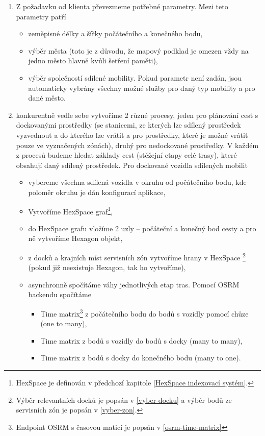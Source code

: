 \documentclass[thesis=M,czech]{FITthesis}[2019/12/23]
\theoremstyle{plain}
\theoremstyle{definition}
\begin{document}
\begin{enumerate}
	\item Z požadavku od klienta převezmeme potřebné parametry. Mezi teto parametry patří
	\begin{itemize}
		\item zeměpisné délky a šířky počátečního a konečného bodu,
		\item výběr města (toto je z důvodu, že mapový podklad je omezen vždy na jedno město hlavně kvůli šetření paměti),
		\item výběr společností sdílené mobility. Pokud parametr není zadán, jsou automaticky vybrány všechny možné služby pro daný typ mobility a pro dané město.
	\end{itemize}
	\item konkurentně vedle sebe vytvoříme 2 různé procesy, jeden pro plánování cest s dockovanými prostředky (se stanicemi, ze kterých lze sdílený prostředek vyzvednout a do kterého lze vrátit a pro prostředky, které je možné vrátit pouze ve vyznačených zónách), druhý pro nedockované prostředky. V každém z procesů budeme hledat základy cest (stěžejní etapy celé trasy), které obsahují daný sdílený prostředek. Pro dockované vozidla sdílených mobilit
	\begin{itemize}
		\item vybereme všechna sdílená vozidla v okruhu od počátečního bodu, kde poloměr okruhu je dán konfigurací aplikace,
		\item Vytvoříme HexSpace graf\footnote{HexSpace je definován v předchozí kapitole \ref{HexSpace indexovací systém}.},
		\item do HexSpace grafu vložíme 2 uzly -- počáteční a konečný bod cesty a pro ně vytvoříme Hexagon objekt,
		\item z docků a krajních míst servisních zón vytvoříme hrany v HexSpace \footnote{ Výběr relevantních docků je popsán v \ref{vyber-docku}  a výběr bodů ze servisních zón je popsán v \ref{vyber-zon}.} (pokud již neexistuje Hexagon, tak ho vytvoříme), 
		\item asynchronně spočítáme váhy jednotlivých etap tras. Pomocí OSRM backendu spočítáme 
		\begin{itemize}
			\item Time matrix\footnote{Endpoint OSRM s časovou maticí je popsán v \ref{osrm-time-matrix}} z počátečního bodu do bodů s vozidly pomocí chůze (one to many),
			\item Time matrix z bodů s vozidly do bodů s docky (many to many),
			\item Time matrix z bodů s docky do konečného bodu (many to one).
		\end{itemize}
		

\end{itemize}
\end{enumerate}
\end{document}
